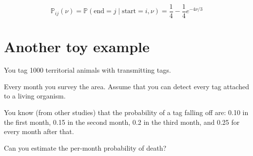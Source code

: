 \documentclass[landscape]{foils}
\renewcommand{\Pr}{\mathbb{P}}
\begin{document}
$$\Pr_{ij}(\nu) = \Pr(\mbox{end}= j \mid \mbox{start}=i, \nu) = \frac{1}{4} - \frac{1}{4}e^{-4\nu/3}$$

%


\myNewSlide
\section*{Another toy example}
You tag 1000 territorial animals with transmitting tags.

Every month you survey the area.
Assume that you can detect every tag attached to a living organism.

You know (from other studies) that the probability of a tag falling off are:
0.10 in the first month, 0.15 in the second month, 0.2 in the third month, and
0.25 for every month after that.

Can you estimate the per-month probability of death?
\end{document}
